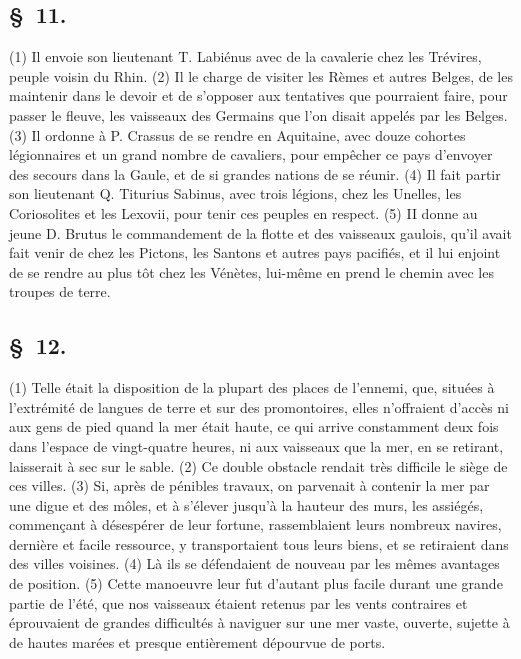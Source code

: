\documentclass[french,twoside]{book} %
\begin{document}
\subsection[{§ 11.}]{ \textsc{§ 11.} }
\noindent (1) Il envoie son lieutenant T. Labiénus avec de la cavalerie chez les Trévires, peuple voisin du Rhin. (2) Il le charge de visiter les Rèmes et autres Belges, de les maintenir dans le devoir et de s’opposer aux tentatives que pourraient faire, pour passer le fleuve, les vaisseaux des Germains que l’on disait appelés par les Belges. (3) Il ordonne à P. Crassus de se rendre en Aquitaine, avec douze cohortes légionnaires et un grand nombre de cavaliers, pour empêcher ce pays d’envoyer des secours dans la Gaule, et de si grandes nations de se réunir. (4) Il fait partir son lieutenant Q. Titurius Sabinus, avec trois légions, chez les Unelles, les Coriosolites et les Lexovii, pour tenir ces peuples en respect. (5) II donne au jeune D. Brutus le commandement de la flotte et des vaisseaux gaulois, qu’il avait fait venir de chez les Pictons, les Santons et autres pays pacifiés, et il lui enjoint de se rendre au plus tôt chez les Vénètes, lui-même en prend le chemin avec les troupes de terre.
\subsection[{§ 12.}]{ \textsc{§ 12.} }
\noindent (1) Telle était la disposition de la plupart des places de l’ennemi, que, situées à l’extrémité de langues de terre et sur des promontoires, elles n’offraient d’accès ni aux gens de pied quand la mer était haute, ce qui arrive constamment deux fois dans l’espace de vingt-quatre heures, ni aux vaisseaux que la mer, en se retirant, laisserait à sec sur le sable. (2) Ce double obstacle rendait très difficile le siège de ces villes. (3) Si, après de pénibles travaux, on parvenait à contenir la mer par une digue et des môles, et à s’élever jusqu’à la hauteur des murs, les assiégés, commençant à désespérer de leur fortune, rassemblaient leurs nombreux navires, dernière et facile ressource, y transportaient tous leurs biens, et se retiraient dans des villes voisines. (4) Là ils se défendaient de nouveau par les mêmes avantages de position. (5) Cette manoeuvre leur fut d’autant plus facile durant une grande partie de l’été, que nos vaisseaux étaient retenus par les vents contraires et éprouvaient de grandes difficultés à naviguer sur une mer vaste, ouverte, sujette à de hautes marées et presque entièrement dépourvue de ports.
\end{document}
